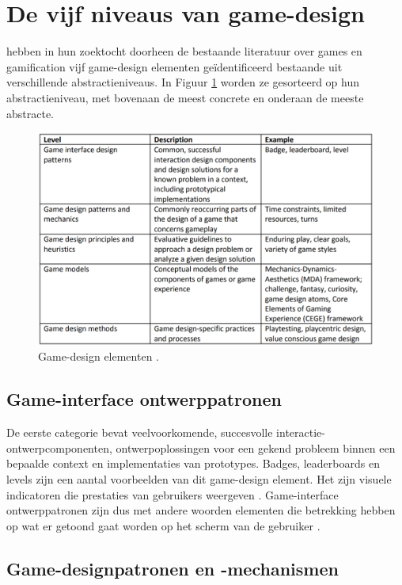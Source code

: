 \section{De vijf niveaus van game-design}

\textcite{Deterding20112} hebben in hun zoektocht doorheen de bestaande literatuur over games en gamification vijf game-design elementen geïdentificeerd bestaande uit verschillende abstractieniveaus. In Figuur \ref{fig:table1} worden ze gesorteerd op hun abstractieniveau, met bovenaan de meest concrete en onderaan de meeste abstracte.

\begin{figure}
    \includegraphics[width=\linewidth]{Deterding2011Table.png}
    \caption{Game-design elementen \autocite{Deterding20112}.}
    \label{fig:table1}
\end{figure}

\subsection{Game-interface ontwerppatronen}

De eerste categorie bevat veelvoorkomende, succesvolle interactie-ontwerpcomponenten, ontwerpoplossingen voor een gekend probleem binnen een bepaalde context en implementaties van prototypes. Badges, leaderboards en levels zijn een aantal voorbeelden van dit game-design element. Het zijn visuele indicatoren die prestaties van gebruikers weergeven \autocite{Morford2014}. Game-interface ontwerppatronen zijn dus met andere woorden elementen die betrekking hebben op wat er getoond gaat worden op het scherm van de gebruiker \autocite{Lindholm2016}.

\subsection{Game-designpatronen en -mechanismen}

